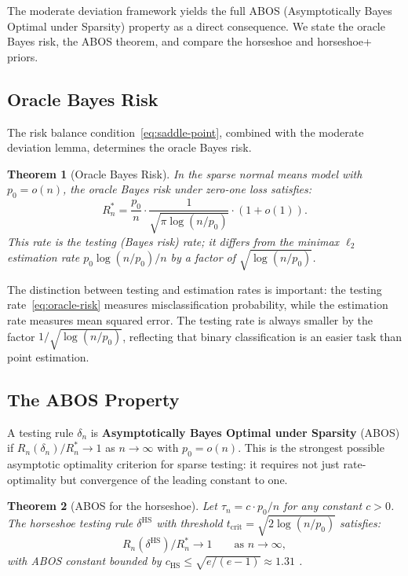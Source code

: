 \documentclass[12pt]{article}
\newtheorem{theorem}{Theorem}[section]
\newcommand{\tcrit}{t_{\mathrm{crit}}}
\begin{document}
The moderate deviation framework yields the full ABOS (Asymptotically Bayes Optimal under Sparsity) property as a direct consequence. We state the oracle Bayes risk, the ABOS theorem, and compare the horseshoe and horseshoe+ priors.

\subsection{Oracle Bayes Risk}\label{sec:oracle-risk}

The risk balance condition~\eqref{eq:saddle-point}, combined with the moderate deviation lemma, determines the oracle Bayes risk.

\begin{theorem}[Oracle Bayes Risk]\label{thm:oracle-risk}
In the sparse normal means model with $p_0 = o(n)$, the oracle Bayes risk under zero-one loss satisfies:
\begin{equation}\label{eq:oracle-risk}
  R_n^* = \frac{p_0}{n} \cdot \frac{1}{\sqrt{\pi\log(n/p_0)}} \cdot (1 + o(1)).
\end{equation}
This rate is the testing (Bayes risk) rate; it differs from the minimax $\ell_2$ estimation rate $p_0\log(n/p_0)/n$ by a factor of $\sqrt{\log(n/p_0)}$.
\end{theorem}

The distinction between testing and estimation rates is important: the testing rate~\eqref{eq:oracle-risk} measures misclassification probability, while the estimation rate measures mean squared error. The testing rate is always smaller by the factor $1/\sqrt{\log(n/p_0)}$, reflecting that binary classification is an easier task than point estimation.

\subsection{The ABOS Property}\label{sec:abos-property}

A testing rule $\delta_n$ is \textbf{Asymptotically Bayes Optimal under Sparsity} (ABOS) if $R_n(\delta_n)/R_n^* \to 1$ as $n \to \infty$ with $p_0 = o(n)$. This is the strongest possible asymptotic optimality criterion for sparse testing: it requires not just rate-optimality but convergence of the leading constant to one.

\begin{theorem}[ABOS for the horseshoe]\label{thm:abos}
Let $\tau_n = c \cdot p_0/n$ for any constant $c > 0$. The horseshoe testing rule $\delta^{\mathrm{HS}}$ with threshold $\tcrit = \sqrt{2\log(n/p_0)}$ satisfies:
\begin{equation}\label{eq:abos}
  R_n(\delta^{\mathrm{HS}}) / R_n^* \to 1 \qquad\text{as } n \to \infty,
\end{equation}
with ABOS constant bounded by $c_{\mathrm{HS}} \leq \sqrt{e/(e-1)} \approx 1.31$ \citep{datta2013asymptotic,bogdan2011asymptotic}.
\end{theorem}
\end{document}
